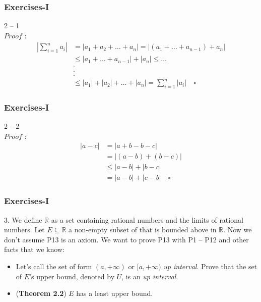 \documentclass[12pt, t]{beamer}
\renewcommand{\emph}[1]{{\color{Turquoise3}\textsl{#1}}}
\begin{document}
\begin{frame}
    \frametitle{Exercises-I}
2 -- 1\\
$Proof$ :
        \begin{equation*}
            \begin{split}
                |\sum^n_{i=1}a_i| &=|a_1+a_2+\dots+a_n|
                    =|(a_1+\dots+a_{n-1})+a_n|\\
                    &\leq |a_1+\dots+a_{n-1}|+|a_n|
                    \leq \dots\\
                    &.\\
                    &.\\
                    &.\\
                    &\leq |a_1|+|a_2|+\dots+|a_n|=\sum^n_{i=1}|a_i|\quad\square
            \end{split}
        \end{equation*}
\end{frame}

\begin{frame}
    \frametitle{Exercises-I}
2 -- 2\\
$Proof$ :
        \begin{equation*}
            \begin{split}
                |a-c|&=|a+b-b-c|\\
                     &=|(a-b)+(b-c)|\\
                     &\leq|a-b|+|b-c|\\
                     &=|a-b|+|c-b| \quad \square
            \end{split}
        \end{equation*}
\end{frame}


\begin{frame}
    \frametitle{Exercises-I}
3. We define $\mathbb{R}$ as a set containing rational numbers and the limits of rational numbers. 
Let $E\subseteq \mathbb{R}$ a non-empty subset of that is bounded above in $\mathbb{R}$. Now we don't 
assume P13 is an axiom. We want to prove P13 with P1 -- P12 and other facts that we know:
\begin{itemize}
    \item Let's call the set of form $(a,+\infty)$ or $[a,+\infty)$ \emph{up interval}. Prove that the 
        set of $E$'s upper bound, denoted by $U$, is an \emph{up interval}.
    \item (\textbf{Theorem 2.2}) $E$ has a least upper bound.
\end{itemize}
\end{frame}
\end{document}

